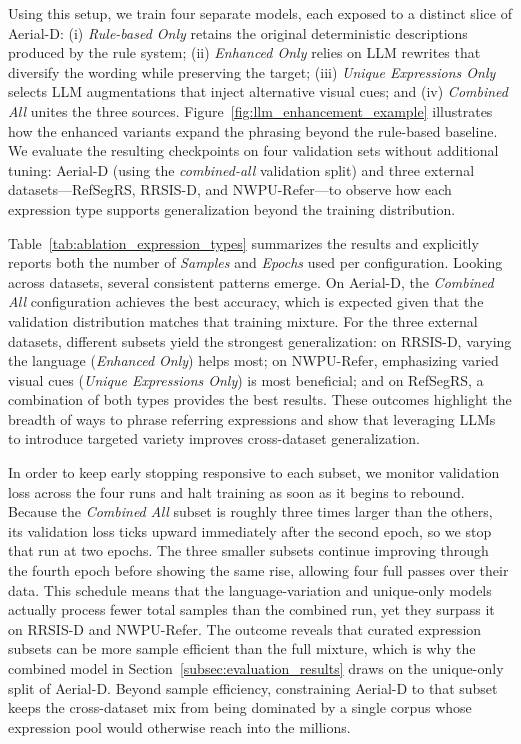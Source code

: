 Using this setup, we train four separate models, each exposed to a distinct slice of Aerial-D: (i) \emph{Rule-based Only} retains the original deterministic descriptions produced by the rule system; (ii) \emph{Enhanced Only} relies on LLM rewrites that diversify the wording while preserving the target; (iii) \emph{Unique Expressions Only} selects LLM augmentations that inject alternative visual cues; and (iv) \emph{Combined All} unites the three sources. Figure~\ref{fig:llm_enhancement_example} illustrates how the enhanced variants expand the phrasing beyond the rule-based baseline. We evaluate the resulting checkpoints on four validation sets without additional tuning: Aerial-D (using the \emph{combined-all} validation split) and three external datasets—RefSegRS, RRSIS-D, and NWPU-Refer—to observe how each expression type supports generalization beyond the training distribution.

Table~\ref{tab:ablation_expression_types} summarizes the results and explicitly reports both the number of \emph{Samples} and \emph{Epochs} used per configuration. Looking across datasets, several consistent patterns emerge. On Aerial-D, the \emph{Combined All} configuration achieves the best accuracy, which is expected given that the validation distribution matches that training mixture. For the three external datasets, different subsets yield the strongest generalization: on RRSIS-D, varying the language (\emph{Enhanced Only}) helps most; on NWPU-Refer, emphasizing varied visual cues (\emph{Unique Expressions Only}) is most beneficial; and on RefSegRS, a combination of both types provides the best results. These outcomes highlight the breadth of ways to phrase referring expressions and show that leveraging LLMs to introduce targeted variety improves cross-dataset generalization.

In order to keep early stopping responsive to each subset, we monitor validation loss across the four runs and halt training as soon as it begins to rebound. Because the \emph{Combined All} subset is roughly three times larger than the others, its validation loss ticks upward immediately after the second epoch, so we stop that run at two epochs. The three smaller subsets continue improving through the fourth epoch before showing the same rise, allowing four full passes over their data. This schedule means that the language-variation and unique-only models actually process fewer total samples than the combined run, yet they surpass it on RRSIS-D and NWPU-Refer. The outcome reveals that curated expression subsets can be more sample efficient than the full mixture, which is why the combined model in Section~\ref{subsec:evaluation_results} draws on the unique-only split of Aerial-D. Beyond sample efficiency, constraining Aerial-D to that subset keeps the cross-dataset mix from being dominated by a single corpus whose expression pool would otherwise reach into the millions.

